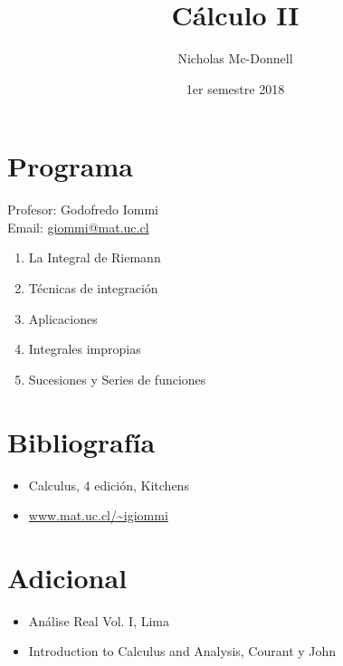 

\title{Cálculo II}
\author{Nicholas Mc-Donnell}
\date{1er semestre 2018}



    \maketitle

    \newpage
    \hfill
    \newpage
    \section*{Programa}
    {\raggedleft Profesor: Godofredo Iommi}\\
    Email: \url{giommi@mat.uc.cl}
    \begin{enumerate}
        \item La Integral de Riemann

        \item Técnicas de integración

        \item Aplicaciones

        \item Integrales impropias

        \item Sucesiones y Series de funciones
    \end{enumerate}

    \section*{Bibliografía}
    \begin{itemize}
        \item Calculus, 4 edición, Kitchens

        \item \url{www.mat.uc.cl/~igiommi}

    \end{itemize}

    \section*{Adicional}
    \begin{itemize}
        \item Análise Real Vol. I, Lima

        \item Introduction to Calculus and Analysis, Courant y John
    \end{itemize}

